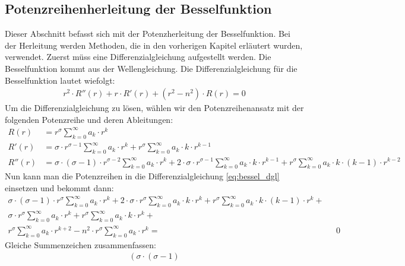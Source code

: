 \begin{refsection}
\section{Potenzreihenherleitung der Besselfunktion}
Dieser Abschnitt befasst sich mit der Potenzherleitung der Besselfunktion. 
Bei der Herleitung werden Methoden, die in den vorherigen Kapitel erl\"autert wurden, 
verwendet. Zuerst m\"uss eine Differenzialgleichung aufgestellt werden.
Die Besselfunktion kommt aus der Wellengleichung.
%
Die Differenzialgleichung für die Besselfunktion lautet wiefolgt:
\begin{align}
	r^2 \cdot R''\left( r \right)
	+
	r \cdot R' \left( r \right)
	+
	\left( r^2 - n^2 \right) \cdot R \left( r \right)
	=
	0
	\label{eq:bessel_dgl}
\end{align}
Um die Differenzialgleichung zu l\"osen, w\"ahlen wir den Potenzreihenansatz mit der folgenden Potenzreihe und deren Ableitungen:
\begin{align*}
	R \left( r \right)
	&=
	r^{\sigma}
	\sum_{k=0}^{\infty} a_k \cdot r^k
\\
	R'\left( r \right)
	&=
	\sigma \cdot r^{\sigma - 1}
	\sum_{k=0}^{\infty} a_k \cdot r^k
	+
	r^{\sigma}
	\sum_{k=0}^{\infty} a_k \cdot k \cdot r^{k - 1}
\\
	R'' \left( r \right)
	&=
	\sigma \cdot \left( \sigma - 1 \right) \cdot r^{\sigma - 2}
	\sum_{k=0}^{\infty} a_k \cdot r^k
	+
	2 \cdot \sigma \cdot r^{\sigma - 1}
	\sum_{k=0}^{\infty} a_k \cdot k \cdot r^{k - 1}
	+
	r^{\sigma}
	\sum_{k=0}^{\infty} a_k \cdot k \cdot \left( k - 1 \right) \cdot r^{k - 2}	
\end{align*}
Nun kann man die Potenzreihen in die Differenzialgleichung \ref{eq:bessel_dgl} einsetzen und bekommt dann:
\begin{align*}
	\sigma \cdot \left( \sigma - 1 \right) \cdot r^{\sigma}
	\sum_{k=0}^{\infty} a_k \cdot r^k
	+
	2 \cdot \sigma \cdot r^{\sigma}
	\sum_{k=0}^{\infty} a_k \cdot k \cdot r^k
	+
	r^{\sigma}
	\sum_{k=0}^{\infty} a_k \cdot k \cdot \left( k - 1 \right) \cdot r^k
	+ \\
	\sigma \cdot r^{\sigma}
	\sum_{k=0}^{\infty} a_k \cdot r^k
	+
	r^{\sigma}
	\sum_{k=0}^{\infty} a_k \cdot k \cdot r^k
	+\\
	r^{\sigma}
	\sum_{k=0}^{\infty} a_k \cdot r^{k + 2}
	-
	n^2 \cdot r^{\sigma}
	\sum_{k=0}^{\infty} a_k \cdot r^k
	= & \text{ } 0
\end{align*}
Gleiche Summenzeichen zusammenfassen:
\begin{align*}
	\left(
	\sigma \cdot \left( \sigma - 1 \right)

\end{align*}
\end{refsection}
